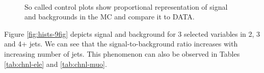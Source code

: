 \begin{figure}[thb]
  \centering
  \\
  \caption{So called control plots show proportional representation of signal and backgrounds in the MC and compare it to DATA.}
  \label{fig:contrPlots}
\end{figure} 

Figure \ref{fig:hists-9fig} depicts signal and background for 3 selected variables in 2, 3 and 4+ jets. We can see that the signal-to-background ratio increases with increasing number of jets. This phenomenon  can also be observed in Tables \ref{tab:chnl-ele} and \ref{tab:chnl-muo}. 
